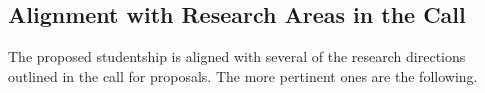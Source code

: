 \documentclass[10pt]{article}
\begin{document}
\begin{center}
\begin{ganttchart}{1}{21}
\ganttnewline
{}

\ganttnewline


\ganttnewline


\ganttnewline


\ganttnewline


\ganttnewline


\end{ganttchart}
\end{center}

\fi

\subsection*{Alignment with Research Areas in the Call}

The proposed studentship is aligned with several of the research directions outlined in the call for proposals. The more pertinent ones are the following. 
\end{document}

